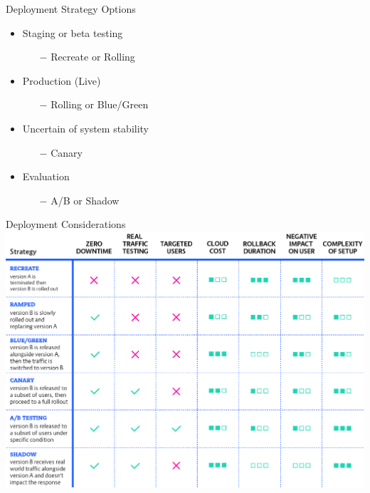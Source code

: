 \documentclass{slide}
\begin{document}
\begin{frame}{Deployment Strategy Options}
  \vspace{1pt}
  {\huge
    \begin{itemize}
        \item Staging or beta testing
        \begin{itemize}
            \LARGE\item[$-$] Recreate or Rolling
        \end{itemize}
        \vspace{1mm}
        \item Production (Live)
        \begin{itemize}
            \LARGE\item[$-$] Rolling or Blue/Green
        \end{itemize}
        \vspace{1mm}
        \item Uncertain of system stability
        \begin{itemize}
            \LARGE\item[$-$] Canary
        \end{itemize}
        \vspace{1mm}
        \item Evaluation
        \begin{itemize}
            \LARGE\item[$-$] A/B or Shadow
        \end{itemize}
    \end{itemize}
  }
\end{frame}

\begin{frame}{Deployment Considerations \cite{deployment-strategies}}
    \centering
    \includegraphics[height=0.93\textheight]{diagrams/deployment_strategies.png}
\end{frame}
\end{document}
